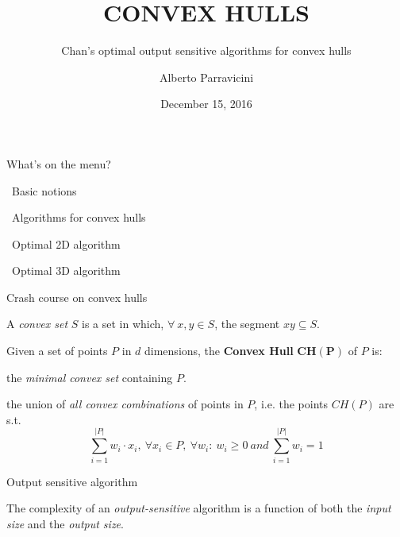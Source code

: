 \documentclass[14pt, handout]{beamer}
\title{CONVEX HULLS}
\subtitle{Chan's optimal output sensitive algorithms for convex hulls}
\author{Alberto Parravicini}
\institute{Université libre de Bruxelles}
\date{December 15, 2016}
\begin{document}
\begin{frame}[plain]
\maketitle
\end{frame}

\begin{frame}{What's on the menu?}
 \begin{fullpageitemize}
  \item<1->[\rtarrow] {\montserratfont\ Basic notions}
  \item<2->[\rtarrow] {\montserratfont\ Algorithms for convex hulls}
  \item<3->[\rtarrow] {\montserratfont\ Optimal 2D algorithm}
  \item<4->[\rtarrow] {\montserratfont\ Optimal 3D algorithm}
 \end{fullpageitemize}
\end{frame}

\begin{frame}{Crash course on convex hulls}
 \begin{center}
 A \textit{convex set} $S$ is a set in which, $\forall\ x, y \in S$, the segment $xy \subseteq S$.
 \vspace{8mm}
 	
 Given a set of points $P$ in $d$ dimensions, the \textbf{Convex Hull} $\mathbf{CH(P)}$ of $P$ is:
 
 \begin{baseitemize}
 	\item<1->[\rtarrow] the \textit{minimal convex set} containing $P$.
 	\vspace{3mm}
 	\item<2->[\rtarrow] the union of \textit{all convex combinations} of  points in $P$, i.e. the points $CH(P)$ are s.t.
	\vspace{-2mm}
 	$$\sum_{i=1}^{|P|}{w_i \cdot x_i},\ \forall x_i \in P,\ \forall w_i:\ w_i \geq 0\ and\ \sum_{i=1}^{|P|}{w_i}=1$$
 \end{baseitemize}
 \end{center}
\end{frame}

\begin{frame}{Output sensitive algorithm}
	\begin{center}
	The complexity of an \textcolor{colorblue}{\textit{output-sensitive}} algorithm is a function of both the \textcolor{colorblue}{\textit{input size}} and the \textcolor{colorblue}{\textit{output size}}.
	\end{center}
\end{frame}
\end{document}
